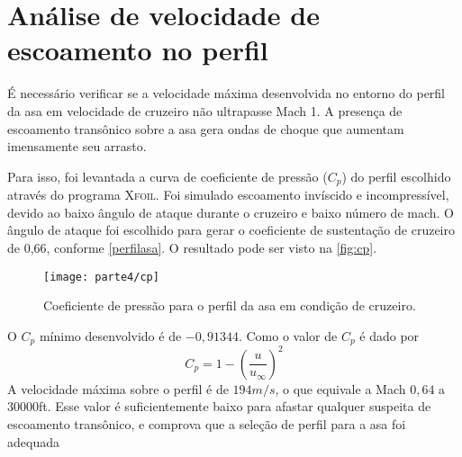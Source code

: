 \chapter{Análise de velocidade de escoamento no perfil}
É necessário verificar se a velocidade máxima desenvolvida no entorno do perfil da asa em velocidade de cruzeiro não ultrapasse Mach 1. A presença de escoamento transônico sobre a asa gera ondas de choque que aumentam imensamente seu arrasto.

Para isso, foi levantada a curva de coeficiente de pressão ($C_p$) do perfil escolhido através do programa \textsc{Xfoil}.
Foi simulado escoamento invíscido e incompressível, devido ao baixo ângulo de ataque durante o cruzeiro e baixo número de mach. O ângulo de ataque foi escolhido para gerar o coeficiente de sustentação de cruzeiro de 0,66, conforme \autoref{perfilasa}. O resultado pode ser visto na \autoref{fig:cp}.

\begin{figure}[b]
    \label{fig:cp}
    \centering
    \texttt{[image: parte4/cp]}
    \caption{Coeficiente de pressão para o perfil da asa em condição de cruzeiro.}
\end{figure}

O $C_p$ mínimo desenvolvido é de $-0,91344$. Como o valor de $C_p$ é dado por
\begin{equation}
    C_p = 1 - \left(\frac{u}{u_\infty}\right)^2
\end{equation}
A velocidade máxima sobre o perfil é de $194\si{m/s}$, o que equivale a Mach $0,64$ a 30000ft. Esse valor é suficientemente baixo para afastar qualquer suspeita de escoamento transônico, e comprova que a seleção de perfil para a asa foi adequada